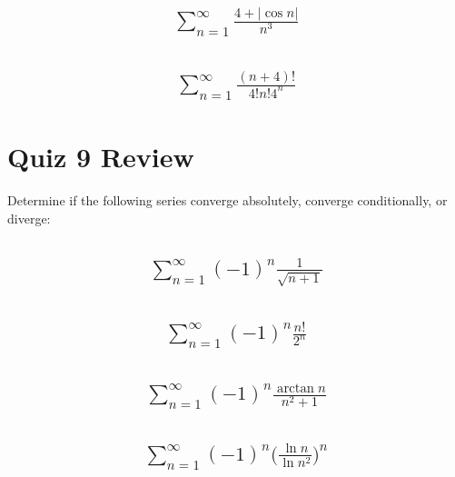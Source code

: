\documentclass{article}
\begin{document}
\subsection{
	\begin{align*}
		\sum_{n = 1}^{\infty} \frac{4 + |\cos{n}|}{n^3}
	\end{align*}
}

\subsection{
	\begin{align*}
		\sum_{n = 1}^{\infty} \frac{(n + 4)!}{4!n!4^n}
	\end{align*}
}















\newpage
\section{Quiz 9 Review}
Determine if the following series converge absolutely, converge conditionally, or diverge:
\subsection{
	\begin{align*}
		\sum_{n = 1}^{\infty} (-1)^n \frac{1}{\sqrt{n + 1}}
	\end{align*}
}

\subsection{
	\begin{align*}
		\sum_{n = 1}^{\infty} (-1)^n \frac{n!}{2^n}
	\end{align*}
}


\subsection{
	\begin{align*}
		\sum_{n = 1}^{\infty} (-1)^n \frac{\arctan{n}}{n^2 + 1}
	\end{align*}
}

\subsection{
	\begin{align*}
		\sum_{n = 1}^{\infty} (-1)^n \bigg( \frac{\ln{n}}{\ln{n^2}} \bigg)^n
	\end{align*}
}
\end{document}
